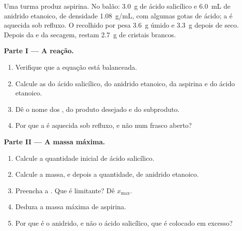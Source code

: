 \begin{problem}
\label{pb:g10:synthesis-yield:1}
Uma turma produz aspirina. No balão: \qty{3.0}{g} de ácido salicílico e
\qty{6.0}{mL} de anidrido etanoico, de densidade \qty{1.08}{g/mL}, com
algumas gotas de ácido; a  é aquecida sob refluxo. O  recolhido por  pesa \qty{3.6}{g} úmido e
\qty{3.3}{g} depois de seco. Depois da  e da secagem,
restam \qty{2.7}{g} de cristais brancos.

\medskip
\noindent\textbf{Parte I --- A reação.}
\begin{enumerate}
  \item Verifique que a equação
         está balanceada.
  \item Calcule as  do ácido salicílico, do anidrido
        etanoico, da aspirina e do ácido etanoico.
  \item Dê o nome dos , do produto desejado e do subproduto.
  \item Por que a  é aquecida sob refluxo, e não num frasco
        aberto?
\end{enumerate}

\medskip
\noindent\textbf{Parte II --- A massa máxima.}
\begin{enumerate}[resume]
  \item Calcule a quantidade inicial de ácido salicílico.
  \item Calcule a massa, e depois a quantidade, de anidrido etanoico.
  \item Preencha a . Que  é limitante? Dê
        $x_{\max}$.
  \item Deduza a massa máxima de aspirina.
  \item Por que é o anidrido, e não o ácido salicílico, que é colocado
        em excesso?
\end{enumerate}


\end{problem}
